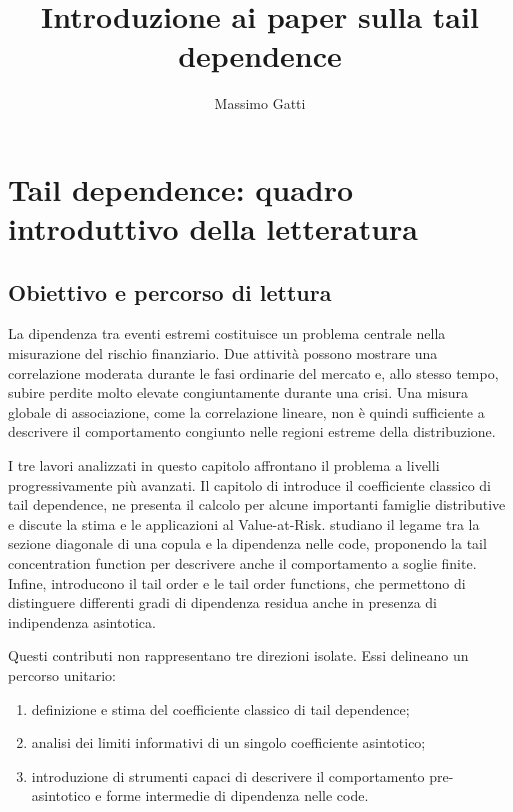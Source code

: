\documentclass[12pt,a4paper,oneside]{book}
\title{Introduzione ai paper sulla tail dependence}
\author{Massimo Gatti}
\date{}
\begin{document}
\maketitle

\chapter[Quadro introduttivo]{Tail dependence: quadro introduttivo della letteratura}
\label{chap:quadro-letteratura}

\section{Obiettivo e percorso di lettura}

La dipendenza tra eventi estremi costituisce un problema centrale nella
misurazione del rischio finanziario. Due attività possono mostrare una
correlazione moderata durante le fasi ordinarie del mercato e, allo stesso
tempo, subire perdite molto elevate congiuntamente durante una crisi. Una
misura globale di associazione, come la correlazione lineare, non è quindi
sufficiente a descrivere il comportamento congiunto nelle regioni estreme
della distribuzione.

I tre lavori analizzati in questo capitolo affrontano il problema a livelli
progressivamente più avanzati. Il capitolo di \textcite{schmidt2005} introduce
il coefficiente classico di tail dependence, ne presenta il calcolo per alcune
importanti famiglie distributive e discute la stima e le applicazioni al
Value-at-Risk. \textcite{duranteEtAl2015} studiano il legame tra la sezione
diagonale di una copula e la dipendenza nelle code, proponendo la tail
concentration function per descrivere anche il comportamento a soglie finite.
Infine, \textcite{huaJoe2011} introducono il tail order e le tail order
functions, che permettono di distinguere differenti gradi di dipendenza
residua anche in presenza di indipendenza asintotica.

Questi contributi non rappresentano tre direzioni isolate. Essi delineano un
percorso unitario:

\begin{enumerate}
    \item definizione e stima del coefficiente classico di tail dependence;
    \item analisi dei limiti informativi di un singolo coefficiente asintotico;
    \item introduzione di strumenti capaci di descrivere il comportamento
    pre-asintotico e forme intermedie di dipendenza nelle code.
\end{enumerate}
\end{document}
